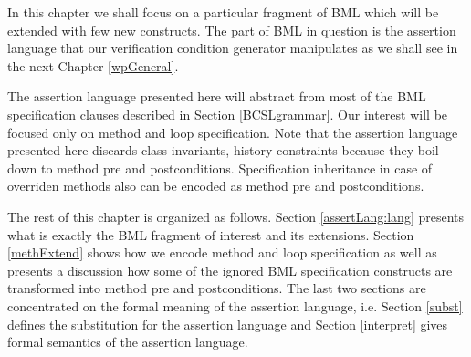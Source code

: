 In this chapter we shall focus on 
 a particular fragment of BML which will be extended with 
few new constructs.  The part of BML in question  
is the assertion language that our  verification condition generator manipulates
 as we shall see in the next Chapter \ref{wpGeneral}.



The assertion language presented here will abstract from most of the BML specification clauses described in Section \ref{BCSLgrammar}.
Our interest will be focused only on method and loop specification.
Note that  the assertion language presented here discards class invariants,
 history constraints  because  they boil down to method pre and postconditions. 
Specification inheritance in case of overriden methods also can be encoded as
 method pre and postconditions.  


The rest of this chapter is organized as follows. Section \ref{assertLang:lang} presents
what is exactly the BML fragment of interest and its extensions.
Section \ref{methExtend} shows how we encode method and loop specification as well as presents a discussion
how some of the ignored BML specification constructs are transformed into method pre and postconditions.
The last two sections are concentrated on the formal meaning of the assertion language, i.e.
Section \ref{subst} defines the substitution for the assertion language and 
 Section \ref{interpret} gives formal semantics of the assertion language.

